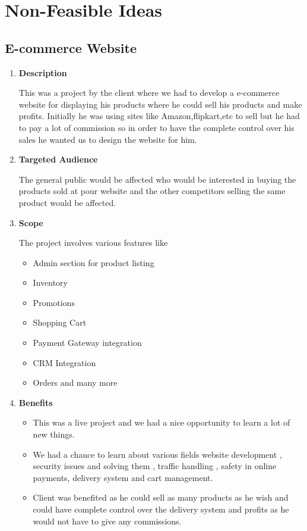 \documentclass[fleqn,10pt]{../SelfArx} %
\begin{document}

\section{Non-Feasible Ideas}
\subsection{E-commerce Website}
\vspace{0.5cm}
\begin{enumerate}
\item \textbf{Description}

This was a project by the client where we had to develop a e-commerce website for displaying his products where he could sell his products and make profits. Initially he was using sites like Amazon,flipkart,etc to sell but he had to pay a lot of commission so in order to have the complete control over his sales he wanted us to design the website for him.

\item \textbf{Targeted Audience}

The general public would be affected who would be interested in buying the products sold at pour website and the other competitors selling the same product would be affected.

\item \textbf{Scope}

The project involves various features like
\begin{itemize}
    \item Admin section for product listing \item Inventory \item Promotions  \item Shopping Cart \item  Payment Gateway integration \item  CRM Integration \item  Orders and many more
\end{itemize}


 \item \textbf{Benefits}
 
\begin{itemize}

    \item This was a live project and we had a nice opportunity to learn a lot of new things.
    \item We had a chance to learn about various fields website development , security issues and solving them , traffic handling , safety in online payments, delivery system and cart management.
 \item Client was benefited as he could sell as many products as he wish and could have complete control over the delivery system and profits as he would not have to give any commissions.
\end{itemize}


\end{enumerate}
\end{document}

